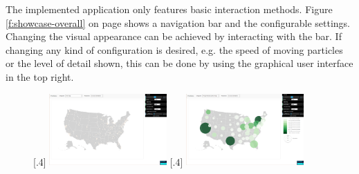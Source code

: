 The implemented application only features basic interaction methods. Figure \ref{f:showcase-overall} on page \pageref{f:showcase-overall} shows a navigation bar and the configurable settings. Changing the visual appearance can be achieved by interacting with the bar. If changing any kind of configuration is desired, e.g. the speed of moving particles or the level of detail shown, this can be done by using the graphical user interface in the top right.

\begin{figure}[!htb]

   \begin{minipage}{\linewidth}
        \centering
        [.4\linewidth]
        {
            \includegraphics[width=0.4\textwidth,keepaspectratio]
            {images/results/map_dot.png}
        }
        \qquad
        [.4\linewidth]
        {
            \includegraphics[width=0.4\textwidth,keepaspectratio]
            {images/results/map_psm.png}
        }
   \end{minipage}


\end{figure}
